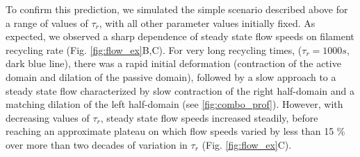 To confirm this prediction, we simulated the simple scenario described above for a range of values of $\tau_r$, with all other parameter values initially fixed. As expected, we observed a sharp dependence of steady state flow speeds on filament recycling rate (Fig. \ref{fig:flow_ex}B,C). For very long recycling times, ($\tau_r=1000 s$, dark blue line), there was a rapid initial deformation (contraction of the active domain and dilation of the passive domain), followed by a slow approach to a steady state flow characterized by slow contraction of the right half-domain and a matching dilation of the left half-domain (see \ref{fig:combo_prof}).  However, with decreasing values of $\tau_r$, steady state flow speeds increased steadily, before reaching an approximate plateau on which flow speeds varied by less than 15 \% over more than two decades of variation in $\tau_r$ (Fig. \ref{fig:flow_ex}C).  

